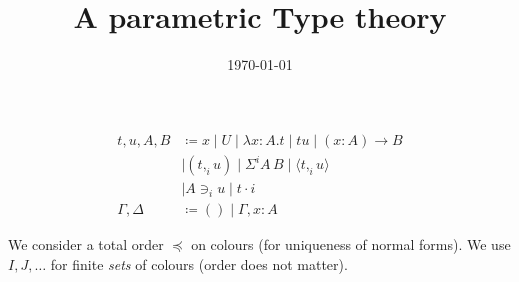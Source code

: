 \documentclass[10pt,a4paper]{article}
\title{A parametric Type theory}
\author{}
\date{\today}
\newcommand\CP[3]{(#2,_{#1} #3)}
\newcommand\param[1]{\!\cdot\!#1}
\newcommand\op[1]{∋_{#1}}
\newcommand\ip[3]{Σ^{#1} {#2}\,{#3}}
\newcommand\fp[3]{⟨#2 ,_{#1} #3⟩}
\begin{document}
\maketitle


\begin{definition}
  \begin{align*}
    t,u,A,B & \coloneqq x \mid U \mid λx:A. t      \mid t u \mid (x:A) → B \\
            & \mid \CP i t u  \mid \ip i A B  \mid \fp i t u \\
            & \mid A \op i u \mid t \param i  \\
    \Gamma,\Delta & \coloneqq () \mid \Gamma,x:A
  \end{align*}
\end{definition}

We consider a total order $\preccurlyeq$ on colours (for uniqueness of
normal forms).
We use $I,J,…$ for finite {\em sets} of colours (order does not matter).
\end{document}
